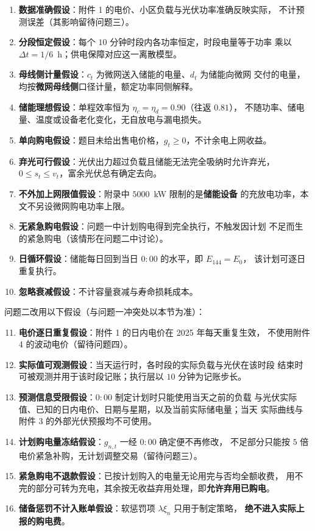 \documentclass[withoutpreface,bwprint]{cumcmthesis}
\begin{document}
\begin{enumerate}
  \item \textbf{数据准确假设}：附件 1 的电价、小区负载与光伏功率准确反映实际，
        不计预测误差（其影响留待问题三）。
  \item \textbf{分段恒定假设}：每个 $10$ 分钟时段内各功率恒定，时段电量等于功率
        乘以 $\Delta t = 1/6$~h；供电保障对应这一离散模型。
  \item \textbf{母线侧计量假设}：$c_t$ 为微网送入储能的电量、$d_t$ 为储能向微网
        交付的电量，均按\textbf{微网母线侧}口径计量，额定功率同侧解释。
  \item \textbf{储能理想假设}：单程效率恒为 $\eta_c=\eta_d=0.90$（往返 $0.81$），
        不随功率、储电量、温度或设备老化变化，无自放电与漏电损失。
  \item \textbf{单向购电假设}：题目未给出售电价格，$g_t \ge 0$，不计余电上网收益。
  \item \textbf{弃光可行假设}：光伏出力超过负载且储能无法完全吸纳时允许弃光，
        $0 \le s_t \le v_t$，富余光伏总有确定去向。
  \item \textbf{不外加上网限值假设}：附录中 $5000$~kW 限制的是\textbf{储能设备}
        的充放电功率，本文不另设微网购电功率上限。
  \item \textbf{无紧急购电假设}：问题一中计划购电得到完全执行，不触发因计划
        不足而生的紧急购电（该情形在问题二中讨论）。
  \item \textbf{日循环假设}：储能每日回到当日 $0{:}00$ 的水平，即 $E_{144}=E_0$，
        该计划可逐日重复执行。
  \item \textbf{忽略衰减假设}：不计容量衰减与寿命损耗成本。
\end{enumerate}

问题二改用以下假设（与问题一冲突处以本节为准）：

\begin{enumerate}
  \setcounter{enumi}{10}
  \item \textbf{电价逐日重复假设}：附件 1 的日内电价在 2025 年每天重复生效，
        不使用附件 4 的波动电价（留待问题四）。
  \item \textbf{实际值可观测假设}：当天运行时，各时段的实际负载与光伏在该时段
        结束时可被观测并用于该时段记账；执行层以 $10$ 分钟为记账步长。
  \item \textbf{预测信息受限假设}：$0{:}00$ 制定计划时只能使用当天之前的负载
        与光伏实际值、已知的日内电价、日期与星期，以及当前实际储电量；当天
        实际曲线与附件 3 的外部光伏预报均不可使用。
  \item \textbf{计划购电量冻结假设}：$g_{n,t}$ 一经 $0{:}00$ 确定便不再修改，
        不足部分只能按 $5$ 倍电价紧急补购，无计划调整交易（留待问题三）。
  \item \textbf{紧急购电不退款假设}：已按计划购入的电量无论用完与否均全额收费，
        用不完的部分可转为充电，其余按无收益弃用处理，即\textbf{允许弃用已购电}。
  \item \textbf{储备惩罚不计入账单假设}：软惩罚项 $\lambda\xi_n$ 只用于制定策略，
        \textbf{绝不进入实际上报的购电费}。
\end{enumerate}
\end{document}
